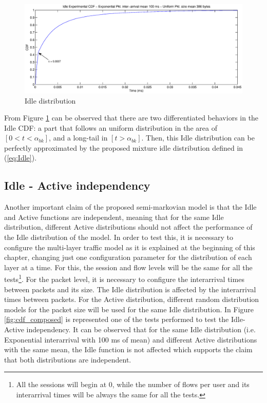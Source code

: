 \begin{figure}[t]
	\centering
	\includegraphics[scale=0.28, trim = 0mm 0mm 6mm 180mm, clip]{images/results/GlobalView/cdf_globalview}
	\caption{Idle distribution}
	\label{fig:cdf_globalview}
\end{figure}

From Figure \ref{fig:cdf_globalview} can be observed that there are two differentiated behaviors in the Idle \acs{CDF}: a part that follows an uniform distribution in the area of $[0 < t < \alpha_{bk}]$, and a long-tail in $[t > \alpha_{bk}]$. Then, this Idle distribution can be perfectly approximated by the proposed mixture idle distribution defined in (\ref{eq:Idle}).


\subsection{Idle - Active independency}
Another important claim of the proposed semi-markovian model is that the Idle and Active functions are independent, meaning that for the same Idle distribution, different Active distributions should not affect the performance of the Idle distribution of the model. In order to test this, it is necessary to configure the multi-layer traffic model as it is explained at the beginning of this chapter, changing just one configuration parameter for the distribution of each layer at a time. For this, the session and flow levels will be the same for all the tests\footnote{All the sessions will begin at 0, while the number of flows per user and its interarrival times will be always the same for all the tests.}. For the packet level, it is necessary to configure the interarrival times between packets and its size. The Idle distribution is affected by the interarrival times between packets. For the Active distribution, different random distribution models for the packet size will be used for the same Idle distribution. In Figure \ref{fig:cdf_composed} is represented one of the tests performed to test the Idle-Active independency. It can be observed that for the same Idle distribution (i.e. Exponential interarrival with 100 ms of mean) and different Active distributions with the same mean, the Idle function is not affected which supports the claim that both distributions are independent.

